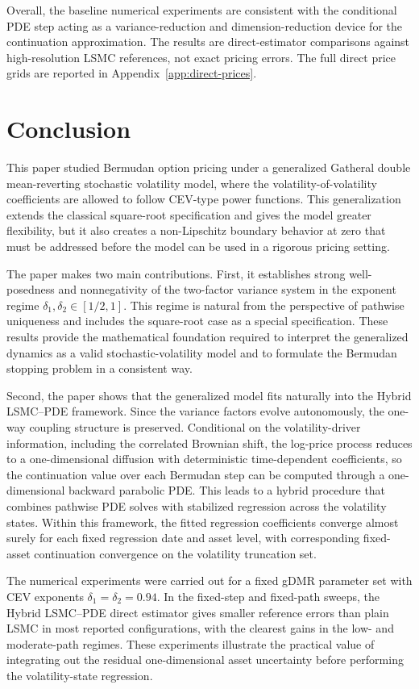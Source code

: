 \documentclass[pdflatex,sn-mathphys-num]{sn-jnl}
\theoremstyle{thmstyleone}%
\theoremstyle{thmstylethree}%
\theoremstyle{thmstyletwo}%
\begin{document}
Overall, the baseline numerical experiments are consistent with the conditional
PDE step acting as a variance-reduction and dimension-reduction device for the
continuation approximation. The results are direct-estimator comparisons against
high-resolution LSMC references, not exact pricing errors. The full direct price
grids are reported in Appendix~\ref{app:direct-prices}.

\section{Conclusion}\label{sec:conclusion}
This paper studied Bermudan option pricing under a generalized Gatheral double mean-reverting stochastic volatility model, where the volatility-of-volatility coefficients are allowed to follow CEV-type power functions. This generalization extends the classical square-root specification and gives the model greater flexibility, but it also creates a non-Lipschitz boundary behavior at zero that must be addressed before the model can be used in a rigorous pricing setting.

The paper makes two main contributions. First, it establishes strong well-posedness and nonnegativity of the two-factor variance system in the exponent regime $\delta_1, \delta_2 \in [1/2,1]$. This regime is natural from the perspective of pathwise uniqueness and includes the square-root case as a special specification. These results provide the mathematical foundation required to interpret the generalized dynamics as a valid stochastic-volatility model and to formulate the Bermudan stopping problem in a consistent way.

Second, the paper shows that the generalized model fits naturally into the Hybrid LSMC--PDE framework. Since the variance factors evolve autonomously, the one-way coupling structure is preserved. Conditional on the volatility-driver information, including the correlated Brownian shift, the log-price process reduces to a one-dimensional diffusion with deterministic time-dependent coefficients, so the continuation value over each Bermudan step can be computed through a one-dimensional backward parabolic PDE. This leads to a hybrid procedure that combines pathwise PDE solves with stabilized regression across the volatility states. Within this framework, the fitted regression coefficients converge almost surely for each fixed regression date and asset level, with corresponding fixed-asset continuation convergence on the volatility truncation set.

The numerical experiments were carried out for a fixed gDMR parameter set with
CEV exponents \(\delta_1=\delta_2=0.94\). In the fixed-step
and fixed-path sweeps, the Hybrid LSMC--PDE direct estimator gives smaller
reference errors than plain LSMC in most reported configurations, with the
clearest gains in the low- and moderate-path regimes. These experiments
illustrate the practical value of integrating out the residual one-dimensional
asset uncertainty before performing the volatility-state regression.
\end{document}
